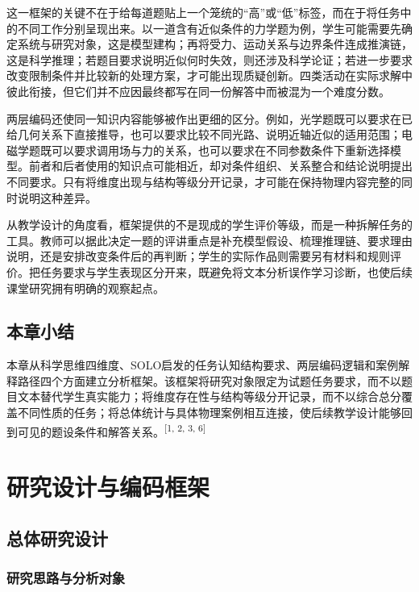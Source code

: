 \documentclass[
  12pt,
  a4paper,twoside,openany]{ctexbook}
\begin{document}
这一框架的关键不在于给每道题贴上一个笼统的``高''或``低''标签，而在于将任务中的不同工作分别呈现出来。以一道含有近似条件的力学题为例，学生可能需要先确定系统与研究对象，这是模型建构；再将受力、运动关系与边界条件连成推演链，这是科学推理；若题目要求说明近似何时失效，则还涉及科学论证；若进一步要求改变限制条件并比较新的处理方案，才可能出现质疑创新。四类活动在实际求解中彼此衔接，但它们并不应因最终都写在同一份解答中而被混为一个难度分数。

两层编码还使同一知识内容能够被作出更细的区分。例如，光学题既可以要求在已给几何关系下直接推导，也可以要求比较不同光路、说明近轴近似的适用范围；电磁学题既可以要求调用场与力的关系，也可以要求在不同参数条件下重新选择模型。前者和后者使用的知识点可能相近，却对条件组织、关系整合和结论说明提出不同要求。只有将维度出现与结构等级分开记录，才可能在保持物理内容完整的同时说明这种差异。

从教学设计的角度看，框架提供的不是现成的学生评价等级，而是一种拆解任务的工具。教师可以据此决定一题的评讲重点是补充模型假设、梳理推理链、要求理由说明，还是安排改变条件后的再判断；学生的实际作品则需要另有材料和规则评价。把任务要求与学生表现区分开来，既避免将文本分析误作学习诊断，也使后续课堂研究拥有明确的观察起点。

\section{本章小结}\label{ux672cux7ae0ux5c0fux7ed3-1}

本章从科学思维四维度、SOLO启发的任务认知结构要求、两层编码逻辑和案例解释路径四个方面建立分析框架。该框架将研究对象限定为试题任务要求，而不以题目文本替代学生真实能力；将维度存在性与结构等级分开记录，而不以综合总分覆盖不同性质的任务；将总体统计与具体物理案例相互连接，使后续教学设计能够回到可见的题设条件和解答关系。\textsuperscript{[1, 2, 3, 6]}

\chapter{研究设计与编码框架}\label{ux7814ux7a76ux8bbeux8ba1ux4e0eux7f16ux7801ux6846ux67b6}

\section{总体研究设计}\label{ux603bux4f53ux7814ux7a76ux8bbeux8ba1}

\subsection{研究思路与分析对象}\label{ux7814ux7a76ux601dux8defux4e0eux5206ux6790ux5bf9ux8c61}
\end{document}
